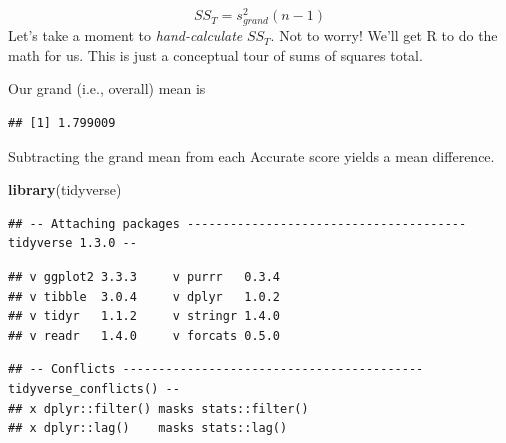 \documentclass[
  english,
]{book}
\newenvironment{Shaded}{\begin{snugshade}}{\end{snugshade}}
\newcommand{\DataTypeTok}[1]{\textcolor[rgb]{0.13,0.29,0.53}{#1}}
\newcommand{\KeywordTok}[1]{\textcolor[rgb]{0.13,0.29,0.53}{\textbf{#1}}}
\newcommand{\NormalTok}[1]{#1}
\newcommand{\OperatorTok}[1]{\textcolor[rgb]{0.81,0.36,0.00}{\textbf{#1}}}
\newcommand{\StringTok}[1]{\textcolor[rgb]{0.31,0.60,0.02}{#1}}
\begin{document}
\[SS_{T}= s_{grand}^{2}(n-1)\]
Let's take a moment to \emph{hand-calculate} \(SS_{T}\). Not to worry! We'll get R to do the math for us. This is just a conceptual tour of sums of squares total.

Our grand (i.e., overall) mean is

\begin{Shaded}
\end{Shaded}

\begin{verbatim}
## [1] 1.799009
\end{verbatim}

Subtracting the grand mean from each Accurate score yields a mean difference.

\begin{Shaded}
\begin{Highlighting}[]
\KeywordTok{library}\NormalTok{(tidyverse)}
\end{Highlighting}
\end{Shaded}

\begin{verbatim}
## -- Attaching packages --------------------------------------- tidyverse 1.3.0 --
\end{verbatim}

\begin{verbatim}
## v ggplot2 3.3.3     v purrr   0.3.4
## v tibble  3.0.4     v dplyr   1.0.2
## v tidyr   1.1.2     v stringr 1.4.0
## v readr   1.4.0     v forcats 0.5.0
\end{verbatim}

\begin{verbatim}
## -- Conflicts ------------------------------------------ tidyverse_conflicts() --
## x dplyr::filter() masks stats::filter()
## x dplyr::lag()    masks stats::lag()
\end{verbatim}

\begin{Shaded}
\end{Shaded}
\end{document}
